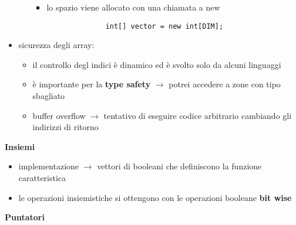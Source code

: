\documentclass[12pt]{extarticle}
\begin{document}
\begin{flushleft}
\begin{itemize}
\begin{itemize}
\begin{itemize}
            \item lo spazio viene allocato con una chiamata a new
            \begin{lstlisting}
              int[] vector = new int[DIM]; 
            \end{lstlisting}
          \end{itemize}
        \end{itemize}
  \item sicurezza degli array:
  \begin{itemize}
    \item il controllo degl indici è dinamico ed è svolto solo da alcuni linguaggi
    \item è importante per la \textbf{type safety} $\rightarrow$ potrei accedere a zone con tipo sbagliato
    \item buffer overflow $\rightarrow$ tentativo di eseguire codice arbitrario cambiando gli indirizzi di ritorno
  \end{itemize}
\end{itemize}

\medskip

\textbf{Insiemi}

\begin{itemize}
  \item implementazione $\rightarrow$ vettori di booleani che definiscono la funzione caratteristica
  \item le operazioni insiemistiche si ottengono con le operazioni booleane \textbf{bit wise}
\end{itemize}

\medskip

\textbf{Puntatori}


\end{flushleft}
\end{document}
